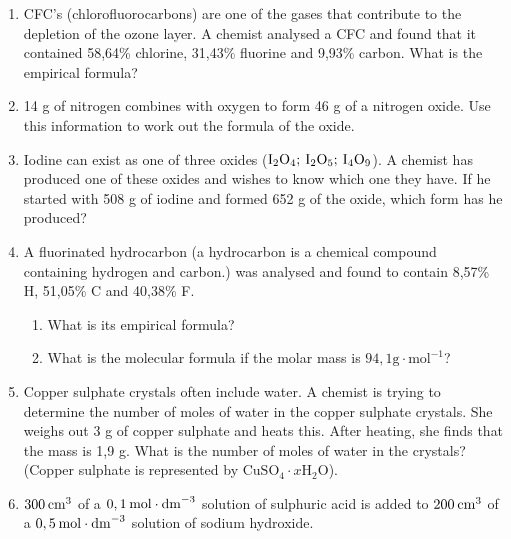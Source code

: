 \begin{enumerate}[noitemsep, label=\textbf{\arabic*}. ]
\item CFC's (chlorofluorocarbons) are one of the gases that contribute to the depletion of the ozone layer. A chemist analysed a CFC and found that it contained 58,64\% chlorine, 31,43\% fluorine and 9,93\% carbon. What is the empirical formula?\newline
            
\item 14 g of nitrogen combines with oxygen to form 46 g of a nitrogen oxide. Use this information to work out the formula of the oxide.\newline
            \item Iodine can exist as one of three oxides (\begin{math}{\mathrm{I}}_{2}{\mathrm{O}}_{4};\phantom{\rule{2pt}{0ex}}{\mathrm{I}}_{2}{\mathrm{O}}_{5};\phantom{\rule{2pt}{0ex}}{\mathrm{I}}_{4}{\mathrm{O}}_{9}\end{math}). A chemist has produced one of these oxides and wishes to know which one they have. If he started with 508 g of iodine and formed 652 g of the oxide, which form has he produced?\newline
            \item A fluorinated hydrocarbon (a hydrocarbon is a chemical compound containing hydrogen and carbon.) was analysed and found to contain 8,57\% H, 51,05\% C and 40,38\% F.\label{m38712*id73222}\begin{enumerate}[noitemsep, label=\textbf{\alph*}. ] 
            \item What is its empirical formula?\item What is the molecular formula if the molar mass is \begin{math}94,1\mathrm{g}\cdot {\mathrm{mol}}^{-1}\end{math}?\end{enumerate}
                \item Copper sulphate crystals often include water. A chemist is trying to determine the number of moles of water in the copper sulphate crystals. She weighs out 3 g of copper sulphate and heats this. After heating, she finds that the mass is 1,9 g. What is the number of moles of water in the crystals? (Copper sulphate is represented by \begin{math}{\mathrm{CuSO}}_{4}\cdot x{\mathrm{H}}_{2}\mathrm{O}\end{math}).        \label{m38712*uid147}\item \begin{math}300\phantom{\rule{2pt}{0ex}}{\mathrm{cm}}^{3}\end{math} of a \begin{math}0,1\phantom{\rule{2pt}{0ex}}\mathrm{mol}\ensuremath{\cdot}{\mathrm{dm}}^{-3}\end{math} solution of sulphuric acid is added to \begin{math}200\phantom{\rule{2pt}{0ex}}{\mathrm{cm}}^{3}\end{math} of a \begin{math}0,5\phantom{\rule{2pt}{0ex}}\mathrm{mol}\ensuremath{\cdot}{\mathrm{dm}}^{-3}\end{math} solution of sodium hydroxide.

\end{enumerate}
